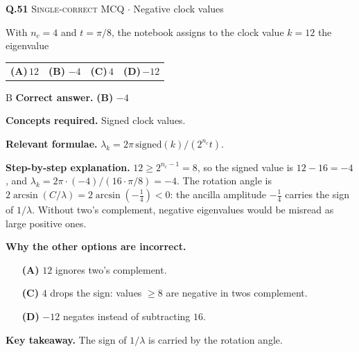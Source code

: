 \documentclass[11pt,a4paper]{article}
\newcommand{\optlabel}[1]{\textbf{(#1)}}
\newcommand{\correctlabel}[1]{\textcolor{okgreen}{\textbf{(#1)}\,\ding{51}}}
\newenvironment{qitem}[1]{\begin{list}{}{\setlength{\leftmargin}{3.3em}\setlength{\labelwidth}{3.1em}%
  \setlength{\labelsep}{0.2em}\setlength{\topsep}{3pt}\setlength{\parsep}{3pt}}\item[\textbf{Q.#1}\hfill]}{\end{list}}
\newcommand{\qsep}{\par\vspace{2pt}{\color{black!15}\hrule}\vspace{4pt}}
\newcommand{\qmeta}[2]{{\footnotesize\color{black!60}\textsc{#1} \;$\cdot$\; #2}\par}
\begin{document}
\begin{qitem}{51}
\qmeta{Single-correct MCQ}{Negative clock values}
With $n_c = 4$ and $t = \pi/8$, the notebook assigns to the clock value $k = 12$ the eigenvalue
\par\smallskip\noindent\begin{tabularx}{\linewidth}{@{}*{4}{L}@{}}
\optlabel{A}\,$12$ & \correctlabel{B}\,$-4$ & \optlabel{C}\,$4$ & \optlabel{D}\,$-12$
\end{tabularx}
\end{qitem}
\begin{solbox}{B}
\textbf{\color{brand}Correct answer.} \textcolor{okgreen}{\textbf{(B)}} $-4$

\textbf{\color{brand}Concepts required.} Signed clock values.

\textbf{\color{brand}Relevant formulae.} $\lambda_k = 2\pi\,\mathrm{signed}(k)/(2^{n_c}t)$.

\textbf{\color{brand}Step-by-step explanation.} $12 \ge 2^{n_c-1} = 8$, so the signed value is $12 - 16 = -4$, and $\lambda_k = 2\pi\cdot(-4)/(16\cdot\pi/8) = -4$. The rotation angle is $2\arcsin(C/\lambda) = 2\arcsin(-\tfrac14) < 0$: the ancilla
amplitude $-\tfrac14$ carries the sign of $1/\lambda$. Without two's complement, negative eigenvalues would be misread as large positive ones.

\textbf{\color{brand}Why the other options are incorrect.}
\begin{itemize}[leftmargin=2.4em, itemsep=1pt, topsep=2pt]
\item[\textbf{(A)}] $12$ ignores two's complement.
\item[\textbf{(C)}] $4$ drops the sign: values $\ge 8$ are negative in two\textquotesingle s complement.
\item[\textbf{(D)}] $-12$ negates instead of subtracting $16$.
\end{itemize}
\textbf{\color{brand}Key takeaway.} The sign of $1/\lambda$ is carried by the rotation angle.
\end{solbox}
\qsep
\end{document}
